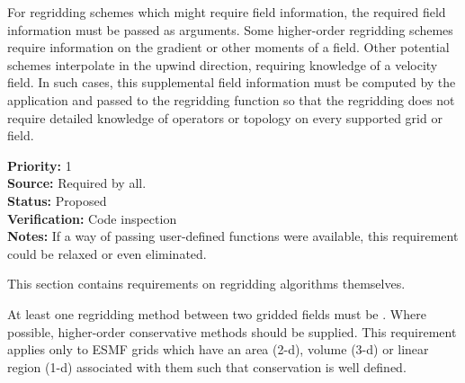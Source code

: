 
For regridding schemes which might require field information,
the required field information must be passed as arguments.
Some higher-order regridding schemes require information on the
gradient or other moments of a field.  Other potential schemes 
interpolate in the upwind direction, requiring knowledge of a 
velocity field.  In such cases, this supplemental field 
information must be computed by the application and passed to 
the regridding function so that the regridding does not
require detailed knowledge of operators or topology on every 
supported grid or field.

\begin{reqlist}
{\bf Priority:} 1 \\
{\bf Source:} Required by all. \\
{\bf Status:} Proposed \\
{\bf Verification:} Code inspection  \\
{\bf Notes:} If a way of passing user-defined functions
             were available, this requirement could be relaxed or even
             eliminated.
\end{reqlist}


This section contains requirements on regridding algorithms themselves.


At least one regridding method between two gridded fields must be
.  Where possible, 
higher-order conservative methods should be supplied.  This requirement
applies only to ESMF grids which have an area (2-d), volume (3-d) or 
linear region (1-d) associated with them such that conservation is well defined.

